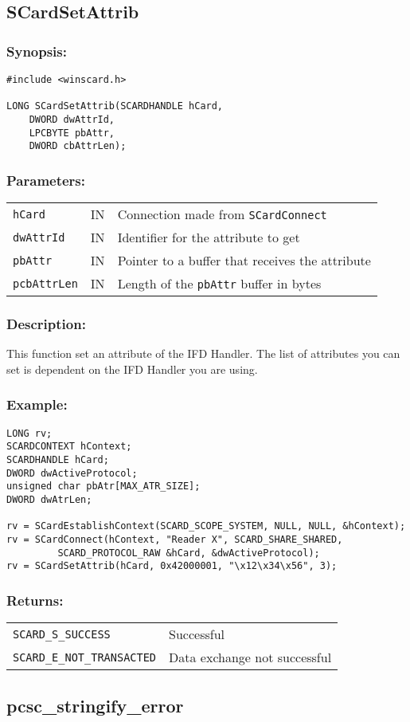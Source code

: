 \documentclass[a4paper,12pt]{article}
\newcommand{\synopsis}{\subsubsection{Synopsis:}}
\newcommand{\parameters}{\subsubsection{Parameters:}}
\newcommand{\desc}{\subsubsection{Description:}}
\newcommand{\example}{\subsubsection{Example:}}
\newcommand{\returns}{\subsubsection{Returns:}}
\begin{document}
\subsection{SCardSetAttrib}

\synopsis

\begin{verbatim}
#include <winscard.h>

LONG SCardSetAttrib(SCARDHANDLE hCard,
    DWORD dwAttrId,
    LPCBYTE pbAttr,
    DWORD cbAttrLen);
\end{verbatim}

\parameters

\begin{tabular}{lll}
\texttt{hCard} & IN &	Connection made from \texttt{SCardConnect}\\
\texttt{dwAttrId} & IN & Identifier for the attribute to get \\
\texttt{pbAttr} & IN &	Pointer to a buffer that receives the attribute \\
\texttt{pcbAttrLen} & IN & Length of the \texttt{pbAttr} buffer in bytes \\
\end{tabular}

\desc

This function set an attribute of the IFD Handler. The list of
attributes you can set is dependent on the IFD Handler you are using.

\example

\begin{verbatim}
LONG rv;
SCARDCONTEXT hContext;
SCARDHANDLE hCard;
DWORD dwActiveProtocol;
unsigned char pbAtr[MAX_ATR_SIZE];
DWORD dwAtrLen;

rv = SCardEstablishContext(SCARD_SCOPE_SYSTEM, NULL, NULL, &hContext);
rv = SCardConnect(hContext, "Reader X", SCARD_SHARE_SHARED,
         SCARD_PROTOCOL_RAW &hCard, &dwActiveProtocol);
rv = SCardSetAttrib(hCard, 0x42000001, "\x12\x34\x56", 3);
\end{verbatim}

\returns

\begin{tabular}{ll}
\texttt{SCARD\_S\_SUCCESS}			& Successful\\
\texttt{SCARD\_E\_NOT\_TRANSACTED}		& Data exchange not successful\\
\end{tabular}


\subsection{pcsc\_stringify\_error}
\end{document}
